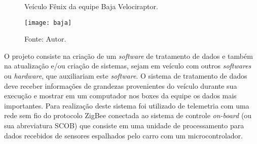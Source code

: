 
\begin{figure}[!htb]
	\centering
		\caption{Veículo Fênix da equipe Baja Velociraptor.}
		\texttt{[image: baja]} 
		\caption*{Fonte: Autor.}
		\label{fig:Baja}
\end{figure} 


O projeto consiste na criação de um \textit{software} de tratamento de dados e também na atualização e/ou criação de sistemas, sejam em veículo com outros \textit{softwares} ou \textit{hardware}, que auxiliariam este \textit{software}. O sistema de tratamento de dados deve receber informações de grandezas provenientes do veículo durante sua execução e mostrar em um computador nos boxes da equipe os dados mais importantes. Para realização deste sistema foi utilizado de telemetria com uma rede sem fio do protocolo ZigBee conectada ao sistema de controle \textit{on-board} (ou sua abreviatura SCOB) que consiste em uma unidade de processamento para dados recebidos de sensores espalhados pelo carro com um microcontrolador.   

